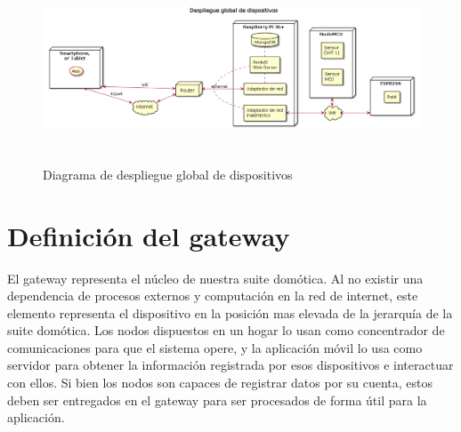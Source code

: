\begin{figure}[hbt!]
\label{globalsystemdeployment}
\centering
\includegraphics[height=2.2in]{figures/diagrams/physical-devices/global.png}
\caption[Diagrama de despiegue global de dispositivos]{Diagrama de despliegue global de dispositivos\footnotemark}
\end{figure}


\section{Definición del gateway}
\label{ch:Capitulo4.2}

El \gls{gateway} representa el núcleo de nuestra suite domótica. Al no existir una dependencia de procesos externos y computación en la red de internet, este elemento representa el dispositivo en la posición mas elevada de la jerarquía de la suite domótica. Los nodos dispuestos en un hogar lo usan como concentrador de comunicaciones para que el sistema opere, y la aplicación móvil lo usa como servidor para obtener la información registrada por esos dispositivos e interactuar con ellos. Si bien los nodos son capaces de registrar datos por su cuenta, estos deben ser entregados en el \gls{gateway} para ser procesados de forma útil para la aplicación.

\vspace{1cm}

